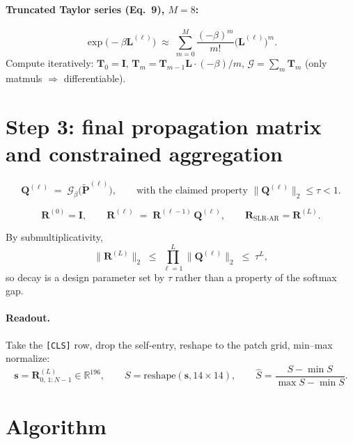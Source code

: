 \documentclass[11pt]{article}
\newcommand{\I}{\mathbf{I}}
\newcommand{\Lap}{\mathbf{L}}
\newcommand{\Pt}{\tilde{\mathbf{P}}}
\newcommand{\Q}{\mathbf{Q}}
\newcommand{\R}{\mathbf{R}}
\newcommand{\Rb}{\mathbb{R}}
\newcommand{\Gcal}{\mathcal{G}}
\begin{document}
\paragraph{Truncated Taylor series (Eq.~9), $M=8$:}
\begin{equation}
\exp\!\big(-\beta\Lap^{(\ell)}\big) \;\approx\; \sum_{m=0}^{M}\frac{(-\beta)^m}{m!}\big(\Lap^{(\ell)}\big)^{m}.
\end{equation}
Compute iteratively: $\mathbf{T}_0=\I$, $\mathbf{T}_m = \mathbf{T}_{m-1}\Lap\cdot(-\beta)/m$,
$\Gcal = \sum_m \mathbf{T}_m$ (only matmuls $\Rightarrow$ differentiable).

\section{Step 3: final propagation matrix and constrained aggregation}

\begin{equation}
\Q^{(\ell)} \;=\; \Gcal_\beta\big(\Pt^{(\ell)}\big),
\qquad \text{with the claimed property } \big\|\Q^{(\ell)}\big\|_2 \le \tau < 1 .
\end{equation}

\begin{equation}
\R^{(0)} = \I,
\qquad
\R^{(\ell)} \;=\; \R^{(\ell-1)}\,\Q^{(\ell)},
\qquad
\R_{\text{SLR-AR}} = \R^{(L)} .
\end{equation}

By submultiplicativity,
\begin{equation}
\big\|\R^{(L)}\big\|_2 \;\le\; \prod_{\ell=1}^{L}\big\|\Q^{(\ell)}\big\|_2 \;\le\; \tau^{L},
\end{equation}
so decay is a design parameter set by $\tau$ rather than a property of the softmax gap.

\paragraph{Readout.} Take the \texttt{[CLS]} row, drop the self-entry, reshape to the
patch grid, min--max normalize:
\begin{equation}
\bm{s} = \R^{(L)}_{0,\,1:N-1}\in\Rb^{196},
\qquad
S = \mathrm{reshape}(\bm{s}, 14\times 14),
\qquad
\hat{S} = \frac{S-\min S}{\max S-\min S}.
\end{equation}

\section{Algorithm}
\end{document}
